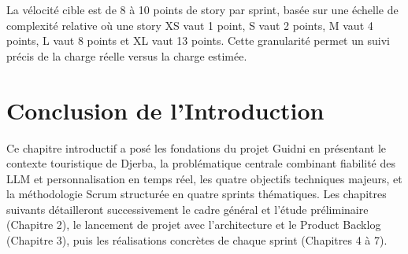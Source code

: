 La vélocité cible est de 8 à 10 points de story par sprint, basée sur une échelle de complexité 
relative où une story XS vaut 1 point, S vaut 2 points, M vaut 4 points, L vaut 8 points et XL 
vaut 13 points. Cette granularité permet un suivi précis de la charge réelle versus la charge 
estimée.

\section{Conclusion de l'Introduction}

Ce chapitre introductif a posé les fondations du projet Guidni en présentant le contexte 
touristique de Djerba, la problématique centrale combinant fiabilité des LLM et personnalisation 
en temps réel, les quatre objectifs techniques majeurs, et la méthodologie Scrum structurée en 
quatre sprints thématiques. Les chapitres suivants détailleront successivement le cadre général 
et l'étude préliminaire (Chapitre 2), le lancement de projet avec l'architecture et le Product 
Backlog (Chapitre 3), puis les réalisations concrètes de chaque sprint (Chapitres 4 à 7).
